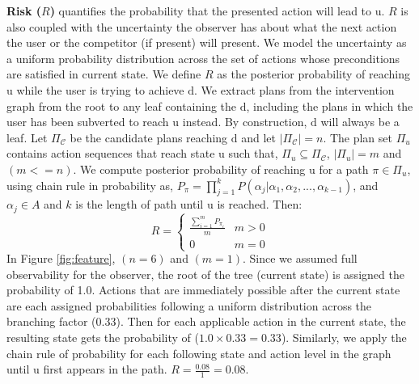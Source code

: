\documentclass[doctor]{thesis} %
\theoremstyle{plain}
\begin{document}
\textbf{Risk ($R$)} quantifies the probability that the presented action will lead to $\mathrm{u}$. $R$ is also coupled with the uncertainty the observer has about what the next action the user or the competitor (if present) will present. We model the uncertainty as a uniform probability distribution across the set of actions whose preconditions are satisfied in current state. We define $R$ as the posterior probability of reaching $\mathrm{u}$ while the user is trying to achieve $\mathrm{d}$. We extract plans from the intervention graph from the root to any leaf containing the $\mathrm{d}$, including the plans in which the user has been subverted to reach $\mathrm{u}$ instead. By construction, $\mathrm{d}$ will always be a leaf.
Let $\Pi_{\mathcal{C}}$ be the candidate plans reaching $\mathrm{d}$ and let $\left | \Pi_{\mathcal{C}} \right |=n$. The plan set $\Pi_{u}$ contains action sequences that reach state $\mathrm{u}$ such that, $\Pi_{u} \subseteq \Pi_{\mathcal{C}}$, $\left | \Pi_{u} \right |=m$ and $(m<=n)$. We compute posterior probability of reaching $\mathrm{u}$ for a path $\pi \in \Pi_{u}$, using chain rule in probability as, $P_{\pi}=\prod_{j=1}^{k}P(\alpha_j|\alpha_1, \alpha_2,...,\alpha_{k-1})$, and $\alpha_{j} \in A$ and $k$ is the length of path until $\mathrm{u}$ is reached. Then: 
\begin{equation*} 
R = \left\{\begin{matrix} \frac{\sum_{i=1}^{m}P_{\pi_i}}{m} & m>0\\ 0 &  m=0 \end{matrix}\right.
\end{equation*}
In Figure \ref{fig:feature}, $(n=6)$ and $(m=1)$. Since we assumed full observability for the observer, the root of the tree (current state) is assigned the probability of 1.0. Actions that are immediately possible after the current state are each assigned probabilities following a uniform distribution across the branching factor (0.33). Then for each applicable action in the current state, the resulting state gets the probability of ($1.0\times0.33=0.33$). Similarly, we apply the chain rule of probability for each following state and action level in the graph until $\mathrm{u}$ first appears in the path. $R=\frac{0.08}{1}=0.08$.
\end{document}
